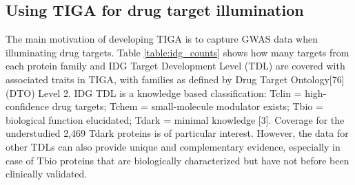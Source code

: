 \subsection{Using TIGA for drug target illumination}

The main motivation of developing TIGA is to capture GWAS data when illuminating drug targets. Table \ref{table:idg_counts} shows how many targets from each protein family and IDG Target Development Level (TDL) are covered with associated traits in TIGA, with families as defined by Drug Target Ontology[76] (DTO) Level 2. IDG TDL is a knowledge based classification: Tclin = high-confidence drug targets; Tchem = small-molecule modulator exists; Tbio = biological function elucidated; Tdark = minimal knowledge [3]. Coverage for the understudied 2,469 Tdark proteins is of particular interest. However, the data for other TDLs can also provide unique and complementary evidence, especially in case of Tbio proteins that are biologically characterized but have not before been clinically validated.


